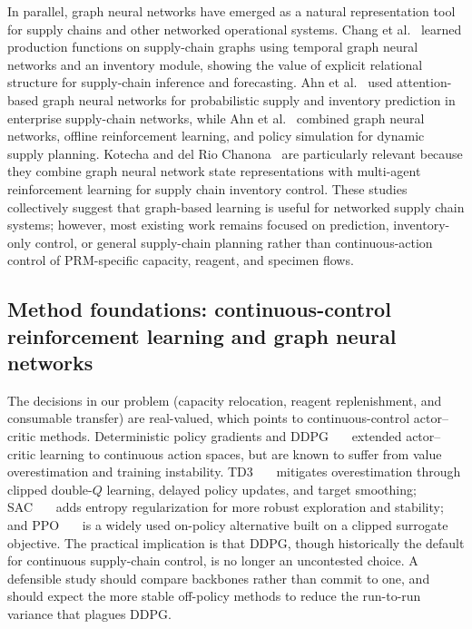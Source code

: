 \documentclass[preprint,review,12pt,nonatbib]{elsarticle}
\providecommand{\DIFadd}[1]{{\protect\color{blue}#1}} %
\providecommand{\DIFaddbegin}{} %
\providecommand{\DIFaddincludegraphics}[2][]{{\color{blue}\fbox{\DIFOincludegraphics[#1]{#2}}}} %
\DeclareRobustCommand{\DIFaddbegin}{\DIFOaddbegin \let\includegraphics\DIFaddincludegraphics} %
\begin{document}
In parallel, graph neural networks have emerged as a natural representation tool for supply chains and other networked operational systems. Chang et al.~\cite{Chang2025AAAI} learned production functions on supply-chain graphs using temporal graph neural networks and an inventory module, showing the value of explicit relational structure for supply-chain inference and forecasting. Ahn et al.~\cite{Ahn2024GSP} used attention-based graph neural networks for probabilistic supply and inventory prediction in enterprise supply-chain networks, while Ahn et al.~\cite{Ahn2024GPP} combined graph neural networks, offline reinforcement learning, and policy simulation for dynamic supply planning. Kotecha and del Rio Chanona~\cite{Kotecha2024GNNMARL} are particularly relevant because they combine graph neural network state representations with multi-agent reinforcement learning for supply chain inventory control. These studies collectively suggest that graph-based learning is useful for networked supply chain systems; however, most existing work remains focused on prediction, inventory-only control, or general supply-chain planning rather than continuous-action control of PRM-specific capacity, reagent, and specimen flows.

\DIFaddbegin \subsection{\DIFadd{Method foundations: continuous-control reinforcement learning and graph neural networks}}
\DIFadd{The decisions in our problem (capacity relocation, reagent replenishment, and consumable transfer) are real-valued, which points to continuous-control actor--critic methods. Deterministic policy gradients and DDPG~\mbox{%
\cite{Lillicrap2016DDPG} }\hskip0pt%
extended actor--critic learning to continuous action spaces, but are known to suffer from value overestimation and training instability. TD3~\mbox{%
\cite{Fujimoto2018TD3} }\hskip0pt%
mitigates overestimation through clipped double-$Q$ learning, delayed policy updates, and target smoothing; SAC~\mbox{%
\cite{Haarnoja2018SAC} }\hskip0pt%
adds entropy regularization for more robust exploration and stability; and PPO~\mbox{%
\cite{Schulman2017PPO} }\hskip0pt%
is a widely used on-policy alternative built on a clipped surrogate objective. The practical implication is that DDPG, though historically the default for continuous supply-chain control, is no longer an uncontested choice. A defensible study should compare backbones rather than commit to one, and should expect the more stable off-policy methods to reduce the run-to-run variance that plagues DDPG.
}
\end{document}
